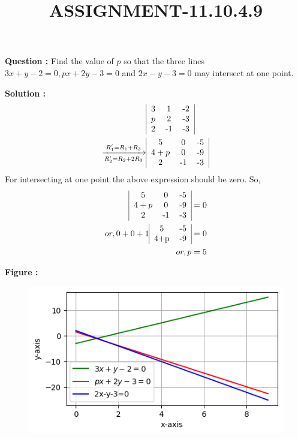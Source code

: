 \documentclass[12pt]{article}
\begin{document}
\title{\textbf{ASSIGNMENT-11.10.4.9}}
\date{}
\maketitle
\textbf{Question :} Find the value of $p$ so that the three lines $3x+y-2=0,px+2y-3=0$ and $2x-y-3=0$ may intersect at one point.


\textbf{Solution :}
\begin{align}  
&\begin{tabular}{|c c c|}
    3 &1&-2 \\
     $p$&2&-3\\
     2&-1&-3
\end{tabular}\\
\xrightarrow[R_2'=R_2+2R_3]{R_1'=R_1+R_3}&\begin{tabular}{|c c c|}
    5&0&-5\\
     $4+p$&0&-9\\
     2&-1&-3
\end{tabular}
\end{align}
For intersecting at one point the above expression should be zero.
So,
\begin{align}
 \begin{tabular}{|c c c|}
    5&0&-5\\
     $4+p$&0&-9\\
     2&-1&-3
\end{tabular}&=0\\
or,0+0+1\begin{tabular}{|c c|}
    5&-5  \\
    4+p &-9
\end{tabular}&=0\\
or,p&=5
\end{align}


\textbf{Figure :}
\begin{figure}
    \centering
    \includegraphics[width=\columnwidth]{fig/11.10.4.9.png}
    \caption{}
    \label{11.10.4.9}
\end{figure}
\end{document}
